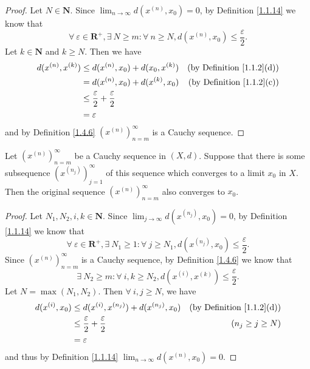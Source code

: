 \begin{proof}
    Let \(N \in \mathbf{N}\).
    Since \(\lim_{n \to \infty} d(x^{(n)}, x_0) = 0\), by Definition \ref{1.1.14} we know that
    \[
        \forall\ \varepsilon \in \mathbf{R}^+, \exists\ N \geq m : \forall\ n \geq N, d(x^{(n)}, x_0) \leq \frac{\varepsilon}{2}.
    \]
    Let \(k \in \mathbf{N}\) and \(k \geq N\).
    Then we have
    \begin{align*}
        d(x^{(n)}, x^{(k)}) & \leq d(x^{(n)}, x_0) + d(x_0, x^{(k)})             & \text{(by Definition \ref{1.1.2}(d))} \\
                            & = d(x^{(n)}, x_0) + d(x^{(k)}, x_0)                & \text{(by Definition \ref{1.1.2}(c))} \\
                            & \leq \frac{\varepsilon}{2} + \frac{\varepsilon}{2}                                         \\
                            & = \varepsilon
    \end{align*}
    and by Definition \ref{1.4.6} \((x^{(n)})_{n = m}^\infty\) is a Cauchy sequence.
\end{proof}

\setcounter{theorem}{8}
\begin{lemma}\label{1.4.9}
    Let \((x^{(n)})_{n = m}^\infty\) be a Cauchy sequence in \((X, d)\).
    Suppose that there is some subsequence \((x^{(n_j)})_{j = 1}^\infty\) of this sequence which converges to a limit \(x_0\) in \(X\).
    Then the original sequence \((x^{(n)})_{n = m}^\infty\) also converges to \(x_0\).
\end{lemma}

\begin{proof}
    Let \(N_1, N_2, i, k \in \mathbf{N}\).
    Since \(\lim_{j \to \infty} d(x^{(n_j)}, x_0) = 0\), by Definition \ref{1.1.14} we know that
    \[
        \forall\ \varepsilon \in \mathbf{R}^+, \exists\ N_1 \geq 1 : \forall\ j \geq N_1, d(x^{(n_j)}, x_0) \leq \frac{\varepsilon}{2}.
    \]
    Since \((x^{(n)})_{n = m}^\infty\) is a Cauchy sequence, by Definition \ref{1.4.6} we know that
    \[
        \exists\ N_2 \geq m : \forall\ i, k \geq N_2, d(x^{(i)}, x^{(k)}) \leq \frac{\varepsilon}{2}.
    \]
    Let \(N = \max(N_1, N_2)\).
    Then \(\forall\ i, j \geq N\), we have
    \begin{align*}
        d(x^{(i)}, x_0) & \leq d(x^{(i)}, x^{(n_j)}) + d(x^{(n_j)}, x_0)     & \text{(by Definition \ref{1.1.2}(d))} \\
                        & \leq \frac{\varepsilon}{2} + \frac{\varepsilon}{2} & (n_j \geq j \geq N)                   \\
                        & = \varepsilon
    \end{align*}
    and thus by Definition \ref{1.1.14} \(\lim_{n \to \infty} d(x^{(n)}, x_0) = 0\).
\end{proof}

